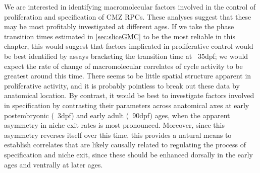We are interested in identifying macromolecular factors involved in the control of proliferation and specification of CMZ RPCs. These analyses suggest that these may be most profitably investigated at different ages. If we take the phase transition times estimated in \autoref{sec:sliceGMC} to be the most reliable in this chapter, this would suggest that factors implicated in proliferative control would be best identified by assays bracketing the transition time at ~35dpf; we would expect the rate of change of macromolecular correlates of cycle activity to be greatest around this time. There seems to be little spatial structure apparent in proliferative activity, and it is probably pointless to break out these data by anatomical location. By contrast, it would be best to investigate factors involved in specification by contrasting their parameters across anatomical axes at early postembryonic (~3dpf) and early adult (~90dpf) ages, when the apparent asymmetry in niche exit rates is most pronounced. Moreover, since this asymmetry reverses itself over this time, this provides a natural means to establish correlates that are likely causally related to regulating the process of specification and niche exit, since these should be enhanced dorsally in the early ages and ventrally at later ages.

